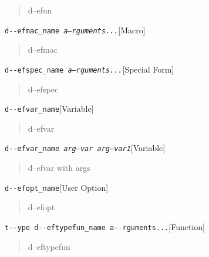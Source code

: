 \documentclass{book}
\begin{document}
\begin{titlepage}
%
\begin{quote}
\unskip{\parskip=0pt\noindent}%
d--efun
\end{quote}

\noindent\texttt{d{-}{-}efmac\_name \EmbracOn{}\textnormal{\textsl{a--rguments...}}\EmbracOff{}}\hfill[Macro]



%
\begin{quote}
\unskip{\parskip=0pt\noindent}%
d--efmac
\end{quote}

\noindent\texttt{d{-}{-}efspec\_name \EmbracOn{}\textnormal{\textsl{a--rguments...}}\EmbracOff{}}\hfill[Special Form]



%
\begin{quote}
\unskip{\parskip=0pt\noindent}%
d--efspec
\end{quote}

\noindent\texttt{d{-}{-}efvar\_name}\hfill[Variable]



%
\begin{quote}
\unskip{\parskip=0pt\noindent}%
d--efvar
\end{quote}

\noindent\texttt{d{-}{-}efvar\_name \EmbracOn{}\textnormal{\textsl{arg--var arg--var1}}\EmbracOff{}}\hfill[Variable]



%
\begin{quote}
\unskip{\parskip=0pt\noindent}%
d--efvar with args
\end{quote}

\noindent\texttt{d{-}{-}efopt\_name}\hfill[User Option]



%
\begin{quote}
\unskip{\parskip=0pt\noindent}%
d--efopt
\end{quote}

\noindent\texttt{t{-}{-}ype d{-}{-}eftypefun\_name a{-}{-}rguments...}\hfill[Function]



%
\begin{quote}
\unskip{\parskip=0pt\noindent}%
d--eftypefun
\end{quote}


\end{titlepage}
\end{document}
